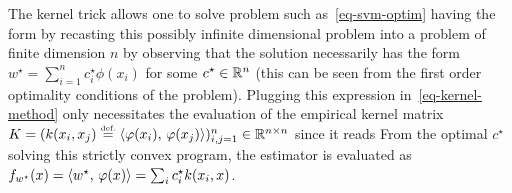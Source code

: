 \begin{rem}
	The kernel trick allows one to solve problem such as~\eqref{eq-svm-optim} having the form
	by recasting this possibly infinite dimensional problem into a problem of finite dimension $n$ by observing that the solution necessarily has the form 
	$w^\star = \sum_{i=1}^n c_i^\star \phi(x_i)$ for some $c^\star \in \mathbb{R}^n$ (this can be seen from the first order optimality conditions of the problem).
	Plugging this expression in~\eqref{eq-kernel-method} only necessitates the evaluation of the empirical kernel matrix $K = ( k(x_i,x_j)\stackrel{\mbox{\upshape\tiny def.}}{=} \langle \varphi(x_i),\,\varphi(x_j)\rangle )_{i,j=1}^n \in \mathbb{R}^{n \times n}$ since it reads
	From the optimal $c^\star$ solving this strictly convex program, the estimator is evaluated as
	$f_{w^\star}(x)=\langle w^\star,\,\varphi(x)\rangle = \sum_i c_i^\star k(x_i,x)$. 
\end{rem} 